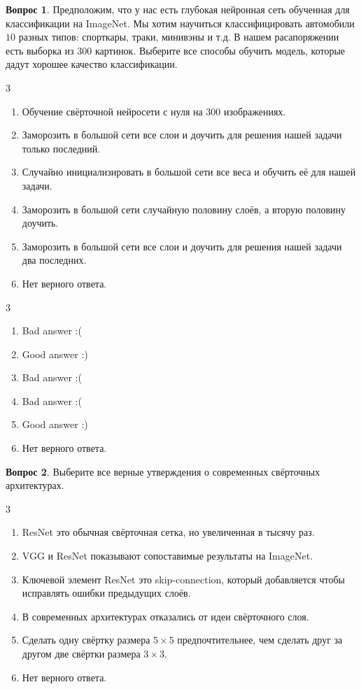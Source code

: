 \documentclass[12pt]{article}
\newenvironment{answerlist}[1][3]{
\begin{multicols}{#1}

\begin{enumerate}[label=\fbox{\emph{\Alph*}},ref=\emph{\alph*}]
}
{
\item Нет верного ответа.
\end{enumerate}
\end{multicols}
}
\theoremstyle{definition}
\newtheorem{question}{Вопрос}
\begin{document}
\begin{question}
Предположим, что у нас есть глубокая нейронная сеть обученная для классификации на ImageNet. Мы хотим научиться классифицировать автомобили $10$ разных типов: спорткары, траки, минивэны и т.д. В нашем расапоряжении есть выборка из $300$ картинок. Выберите все способы обучить модель, которые дадут хорошее качество классификации. 
\begin{answerlist}
  \item Обучение свёрточной нейросети с нуля на $300$ изображениях.
  \item Заморозить в большой сети все слои и доучить для решения нашей задачи только последний. 
  \item Случайно инициализировать в большой сети все веса и обучить её для нашей задачи. 
  \item Заморозить в большой сети случайную половину слоёв, а вторую половину доучить.
  \item Заморозить в большой сети все слои и доучить для решения нашей задачи два последних. 
\end{answerlist}
\end{question}

\begin{solution}
\begin{answerlist}
  \item Bad answer :(
  \item Good answer :)
  \item Bad answer :(
  \item Bad answer :(
  \item Good answer :)
\end{answerlist}
\end{solution}

\newpage 

\begin{question}
Выберите все верные утверждения о современных свёрточных архитектурах. 
\begin{answerlist}
  \item ResNet это обычная свёрточная сетка, но увеличенная в тысячу раз. 
  \item VGG и ResNet показывают сопоставимые результаты на ImageNet.
  \item Ключевой элемент ResNet это skip-connection, который добавляется чтобы исправлять ошибки предыдущих слоёв.
  \item В современных архитектурах отказались от идеи свёрточного слоя.
  \item Сделать одну свёртку размера $5\times5$ предпочтительнее, чем сделать друг за другом две свёртки размера $3\times3$.
\end{answerlist}
\end{question}
\end{document}
